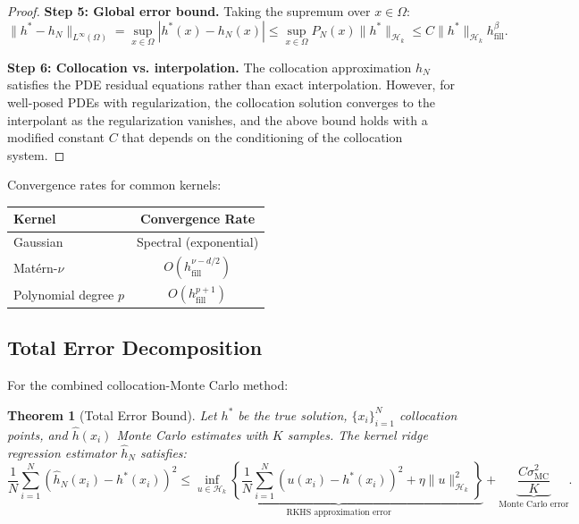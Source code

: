 \documentclass[11pt,a4paper]{article}
\newtheorem{theorem}{Theorem}[section]
\newcommand{\RKHS}{\mathcal{H}_k}
\begin{document}
\begin{proof}
\textbf{Step 5: Global error bound.}
Taking the supremum over $x \in \Omega$:
\begin{equation}
\|h^* - h_N\|_{L^\infty(\Omega)} = \sup_{x \in \Omega}|h^*(x) - h_N(x)| \leq \sup_{x \in \Omega} P_N(x) \|h^*\|_{\RKHS} \leq C \|h^*\|_{\RKHS} h_{\mathrm{fill}}^\beta.
\end{equation}

\textbf{Step 6: Collocation vs. interpolation.}
The collocation approximation $h_N$ satisfies the PDE residual equations rather than exact interpolation. However, for well-posed PDEs with regularization, the collocation solution converges to the interpolant as the regularization vanishes, and the above bound holds with a modified constant $C$ that depends on the conditioning of the collocation system.
\end{proof}

Convergence rates for common kernels:
\begin{center}
\begin{tabular}{lc}
\toprule
Kernel & Convergence Rate \\
\midrule
Gaussian & Spectral (exponential) \\
Mat\'{e}rn-$\nu$ & $O(h_{\mathrm{fill}}^{\nu - d/2})$ \\
Polynomial degree $p$ & $O(h_{\mathrm{fill}}^{p+1})$ \\
\bottomrule
\end{tabular}
\end{center}

\subsection{Total Error Decomposition}

For the combined collocation-Monte Carlo method:

\begin{theorem}[Total Error Bound]\label{thm:total_error}
Let $h^*$ be the true solution, $\{x_i\}_{i=1}^N$ collocation points, and $\widehat{h}(x_i)$ Monte Carlo estimates with $K$ samples. The kernel ridge regression estimator $\widehat{h}_N$ satisfies:
\begin{equation}
\frac{1}{N}\sum_{i=1}^N (\widehat{h}_N(x_i) - h^*(x_i))^2 \leq \underbrace{\inf_{u \in \RKHS}\left\{\frac{1}{N}\sum_{i=1}^N(u(x_i) - h^*(x_i))^2 + \eta\|u\|_{\RKHS}^2\right\}}_{\text{RKHS approximation error}} + \underbrace{\frac{C\sigma_{\mathrm{MC}}^2}{K}}_{\text{Monte Carlo error}}.
\end{equation}
\end{theorem}
\end{document}
